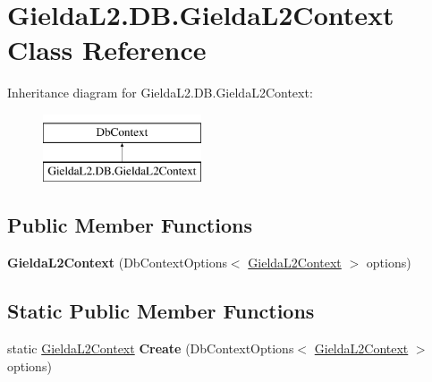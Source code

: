 \hypertarget{class_gielda_l2_1_1_d_b_1_1_gielda_l2_context}{}\section{Gielda\+L2.\+D\+B.\+Gielda\+L2\+Context Class Reference}
\label{class_gielda_l2_1_1_d_b_1_1_gielda_l2_context}
Inheritance diagram for Gielda\+L2.\+D\+B.\+Gielda\+L2\+Context\+:\begin{figure}[H]
\begin{center}
\leavevmode
\includegraphics[height=2.000000cm]{class_gielda_l2_1_1_d_b_1_1_gielda_l2_context}
\end{center}
\end{figure}
\subsection*{Public Member Functions}
\begin{DoxyCompactItemize}
\item 
\mbox{\label{class_gielda_l2_1_1_d_b_1_1_gielda_l2_context_a73cbf4be075384f4c95458509e124759}} 
{\bfseries Gielda\+L2\+Context} (Db\+Context\+Options$<$ \mbox{\hyperlink{class_gielda_l2_1_1_d_b_1_1_gielda_l2_context}{Gielda\+L2\+Context}} $>$ options)
\end{DoxyCompactItemize}
\subsection*{Static Public Member Functions}
\begin{DoxyCompactItemize}
\item 
\mbox{\label{class_gielda_l2_1_1_d_b_1_1_gielda_l2_context_ac45f5b7d727e7b4d2deadb1f81ae733a}} 
static \mbox{\hyperlink{class_gielda_l2_1_1_d_b_1_1_gielda_l2_context}{Gielda\+L2\+Context}} {\bfseries Create} (Db\+Context\+Options$<$ \mbox{\hyperlink{class_gielda_l2_1_1_d_b_1_1_gielda_l2_context}{Gielda\+L2\+Context}} $>$ options)
\end{DoxyCompactItemize}
